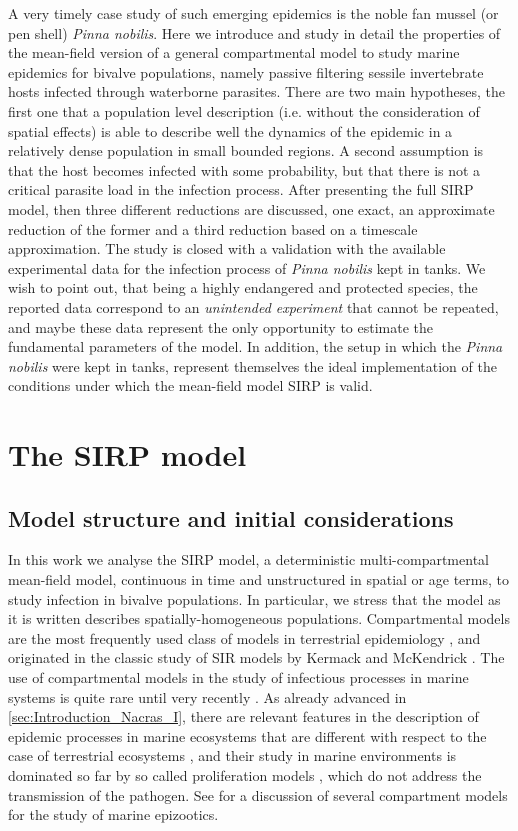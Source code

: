 A very timely case study of such emerging epidemics is the noble fan
mussel (or pen shell) \textit{Pinna nobilis}. Here we introduce and study in
detail the properties of the mean-field version of a general compartmental
model to study marine epidemics for bivalve populations, namely passive
filtering sessile invertebrate hosts infected through waterborne parasites.
There are two main hypotheses, the first one that a population level
description (i.e. without the consideration of spatial effects) is able to
describe well the dynamics of the epidemic in a relatively dense population in
small bounded regions. A second assumption is that the host becomes infected
with some probability, but that there is not a critical parasite load in the
infection process. After presenting the full SIRP model, then three different
reductions are discussed, one exact, an approximate reduction of the former and
a third reduction based on a timescale approximation. The study is closed with
a validation with the available experimental data for the infection process of
\textit{Pinna nobilis} kept in tanks. We wish to point out, that being a highly
endangered and protected species, the reported data correspond to an
\textit{unintended experiment} that cannot be repeated, and maybe these data
represent the only opportunity to estimate the fundamental parameters of the
model. In addition, the setup in which the \textit{Pinna nobilis} were kept in
tanks, represent themselves the ideal implementation of the conditions under
which the mean-field model SIRP is valid.

\section{The SIRP model} \label{sec:model_Nacras_I}

\subsection{Model structure and initial considerations} \label{subsec:modtruct}

In this work we analyse the SIRP model, a deterministic multi-compartmental
mean-field model,
continuous in time and unstructured in spatial or age terms,
to study infection in bivalve populations. In particular, we stress that
the model as it is written describes spatially-homogeneous populations.
Compartmental models are the
most frequently used class of models in terrestrial epidemiology
\cite{DiekmannBook}, and originated in the classic study of SIR models
by Kermack and McKendrick \cite{McKendrick}. The use of compartmental
models in the study of infectious processes in marine systems is quite
rare until very recently \cite{Harvell2004}. As already advanced in
\cref{sec:Introduction_Nacras_I}, there are relevant features in the
description of epidemic processes in
marine ecosystems that are different with respect to the case of
terrestrial ecosystems \cite{MCCALLUM_intro},
and their study in marine environments is dominated so far by so called
proliferation
models \cite{Powell2015}, which do not address the transmission of the
pathogen. See \cite{article_SIP} for a discussion of several compartment
models for the study of marine epizootics.

